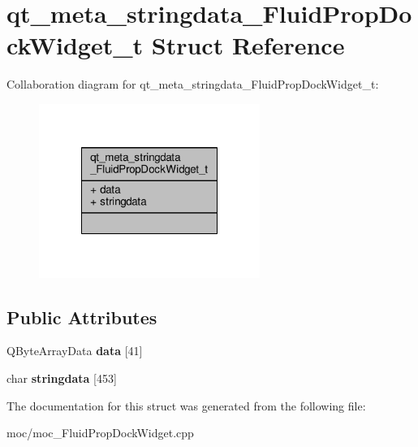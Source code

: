 \hypertarget{structqt__meta__stringdata___fluid_prop_dock_widget__t}{\section{qt\-\_\-meta\-\_\-stringdata\-\_\-\-Fluid\-Prop\-Dock\-Widget\-\_\-t Struct Reference}
\label{structqt__meta__stringdata___fluid_prop_dock_widget__t}
}


Collaboration diagram for qt\-\_\-meta\-\_\-stringdata\-\_\-\-Fluid\-Prop\-Dock\-Widget\-\_\-t\-:\nopagebreak
\begin{figure}[H]
\begin{center}
\leavevmode
\includegraphics[width=204pt]{structqt__meta__stringdata___fluid_prop_dock_widget__t__coll__graph}
\end{center}
\end{figure}
\subsection*{Public Attributes}
\begin{DoxyCompactItemize}
\item 
\hypertarget{structqt__meta__stringdata___fluid_prop_dock_widget__t_a4ec27da0a498540f17a8b4012ba7010a}{Q\-Byte\-Array\-Data {\bfseries data} \mbox{[}41\mbox{]}}\label{structqt__meta__stringdata___fluid_prop_dock_widget__t_a4ec27da0a498540f17a8b4012ba7010a}

\item 
\hypertarget{structqt__meta__stringdata___fluid_prop_dock_widget__t_a853bb9fbb11a9682d7c74ce25980bf6c}{char {\bfseries stringdata} \mbox{[}453\mbox{]}}\label{structqt__meta__stringdata___fluid_prop_dock_widget__t_a853bb9fbb11a9682d7c74ce25980bf6c}

\end{DoxyCompactItemize}


The documentation for this struct was generated from the following file\-:\begin{DoxyCompactItemize}
\item 
moc/moc\-\_\-\-Fluid\-Prop\-Dock\-Widget.\-cpp\end{DoxyCompactItemize}
